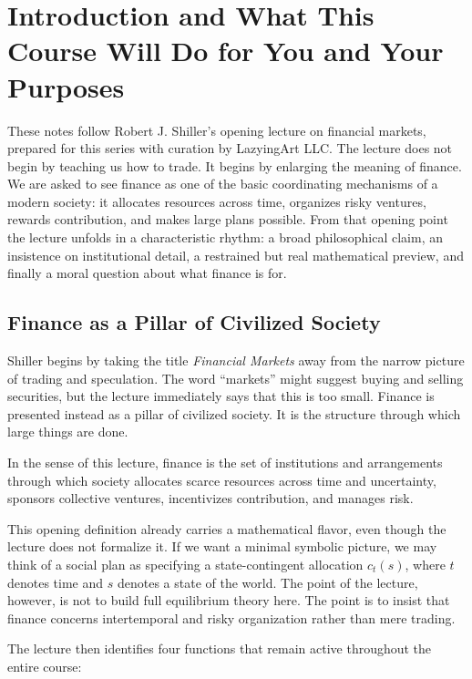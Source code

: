 \chapter{Introduction and What This Course Will Do for You and Your Purposes}

These notes follow Robert J. Shiller's opening lecture on financial markets, prepared for this series with curation by LazyingArt LLC. The lecture does not begin by teaching us how to trade. It begins by enlarging the meaning of finance. We are asked to see finance as one of the basic coordinating mechanisms of a modern society: it allocates resources across time, organizes risky ventures, rewards contribution, and makes large plans possible. From that opening point the lecture unfolds in a characteristic rhythm: a broad philosophical claim, an insistence on institutional detail, a restrained but real mathematical preview, and finally a moral question about what finance is for.

\section{Finance as a Pillar of Civilized Society}

Shiller begins by taking the title \emph{Financial Markets} away from the narrow picture of trading and speculation. The word ``markets'' might suggest buying and selling securities, but the lecture immediately says that this is too small. Finance is presented instead as a pillar of civilized society. It is the structure through which large things are done.

\begin{definition}
In the sense of this lecture, finance is the set of institutions and arrangements through which society allocates scarce resources across time and uncertainty, sponsors collective ventures, incentivizes contribution, and manages risk.
\end{definition}

This opening definition already carries a mathematical flavor, even though the lecture does not formalize it. If we want a minimal symbolic picture, we may think of a social plan as specifying a state-contingent allocation \(c_t(s)\), where \(t\) denotes time and \(s\) denotes a state of the world. The point of the lecture, however, is not to build full equilibrium theory here. The point is to insist that finance concerns intertemporal and risky organization rather than mere trading.

The lecture then identifies four functions that remain active throughout the entire course:

